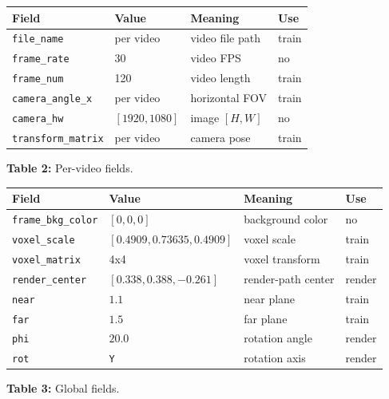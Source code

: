 \begin{center}
    \begingroup
    \scriptsize
    \renewcommand{\arraystretch}{1.1}
    \setlength{\tabcolsep}{3pt}
    \begin{tabularx}{\columnwidth}{@{}ll>{\raggedright\arraybackslash}Xl@{}}
        \toprule
        \textbf{Field} & \textbf{Value} & \textbf{Meaning} & \textbf{Use} \\
        \midrule
        \texttt{file\_name} & per video & video file path & train \\
        \texttt{frame\_rate} & 30 & video FPS & no \\
        \texttt{frame\_num} & 120 & video length & train \\
        \texttt{camera\_angle\_x} & per video & horizontal FOV & train \\
        \texttt{camera\_hw} & \([1920,1080]\) & image \([H,W]\) & no \\
        \texttt{transform\_matrix} & per video & camera pose & train \\
        \bottomrule
    \end{tabularx}
    \par\smallskip
    \footnotesize\textbf{Table 2:} Per-video fields.
    \endgroup
\end{center}

\begin{center}
    \begingroup
    \scriptsize
    \renewcommand{\arraystretch}{1.1}
    \setlength{\tabcolsep}{3pt}
    \begin{tabularx}{\columnwidth}{@{}ll>{\raggedright\arraybackslash}Xl@{}}
        \toprule
        \textbf{Field} & \textbf{Value} & \textbf{Meaning} & \textbf{Use} \\
        \midrule
        \texttt{frame\_bkg\_color} & \([0,0,0]\) & background color & no \\
        \texttt{voxel\_scale} & \([0.4909,0.73635,0.4909]\) & voxel scale & train \\
        \texttt{voxel\_matrix} & 4x4 & voxel transform & train \\
        \texttt{render\_center} & \([0.338,0.388,-0.261]\) & render-path center & render \\
        \texttt{near} & \(1.1\) & near plane & train \\
        \texttt{far} & \(1.5\) & far plane & train \\
        \texttt{phi} & \(20.0\) & rotation angle & render \\
        \texttt{rot} & \texttt{Y} & rotation axis & render \\
        \bottomrule
    \end{tabularx}
    \par\smallskip
    \footnotesize\textbf{Table 3:} Global fields.
    \endgroup
\end{center}

